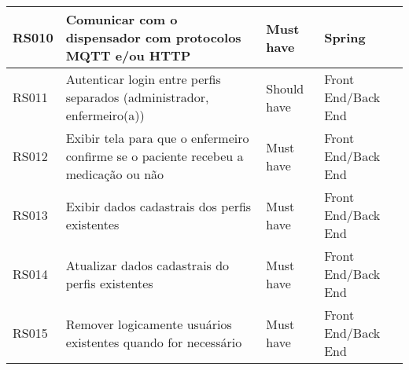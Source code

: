 \begin{table}[H]
\begin{adjustbox}{max width = \textwidth}
\begin{tabular}{|L{1.5cm}|L{8.5cm}|C{2.5cm}|C{3.5cm}|}
        RS010 & Comunicar com o dispensador com protocolos MQTT e/ou HTTP & Must have & Spring \\ 
        \hline
        RS011 & Autenticar login entre perfis separados (administrador, enfermeiro(a)) & Should have & Front End/Back End \\ 
        \hline
        RS012 & Exibir tela para que o enfermeiro confirme se o paciente recebeu a medicação ou não & Must have & Front End/Back End \\ \hline
        RS013 & Exibir dados cadastrais dos perfis existentes & Must have & Front End/Back End \\ \hline
        RS014 & Atualizar dados cadastrais do perfis existentes & Must have & Front End/Back End \\ \hline
        RS015 & Remover logicamente usuários existentes quando for necessário & Must have & Front End/Back End \\ \hline
        \end{tabular}
	\end{adjustbox}
\end{table}


